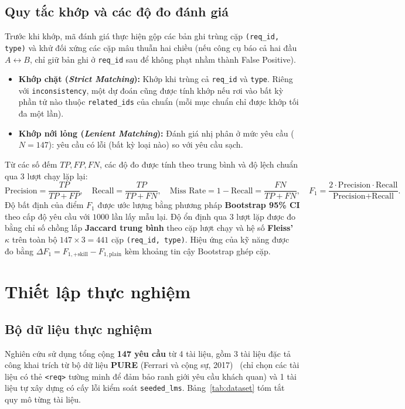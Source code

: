\documentclass[12pt,a4paper]{report}
\begin{document}
\section{Quy tắc khớp và các độ đo đánh giá}
Trước khi khớp, mã đánh giá thực hiện gộp các bản ghi trùng cặp \texttt{(req\_id, type)} và khử đối xứng các cặp mâu thuẫn hai chiều (nếu công cụ báo cả hai đầu $A \leftrightarrow B$, chỉ giữ bản ghi ở \texttt{req\_id} sau để không phạt nhầm thành False Positive).
\begin{itemize}
  \item \textbf{Khớp chặt (\textit{Strict Matching}):} Khớp khi trùng cả \texttt{req\_id} và \texttt{type}. Riêng với \texttt{inconsistency}, một dự đoán cũng được tính khớp nếu rơi vào bất kỳ phần tử nào thuộc \texttt{related\_ids} của chuẩn (mỗi mục chuẩn chỉ được khớp tối đa một lần).
  \item \textbf{Khớp nới lỏng (\textit{Lenient Matching}):} Đánh giá nhị phân ở mức yêu cầu ($N = 147$): yêu cầu có lỗi (bất kỳ loại nào) so với yêu cầu sạch.
\end{itemize}

Từ các số đếm $TP, FP, FN$, các độ đo được tính theo trung bình và độ lệch chuẩn qua 3 lượt chạy lặp lại:
\[
  \text{Precision} = \frac{TP}{TP + FP}, \quad
  \text{Recall} = \frac{TP}{TP + FN}, \quad
  \text{Miss Rate} = 1 - \text{Recall} = \frac{FN}{TP + FN}, \quad
  F_1 = \frac{2 \cdot \text{Precision} \cdot \text{Recall}}{\text{Precision} + \text{Recall}}.
\]
Độ bất định của điểm $F_1$ được ước lượng bằng phương pháp \textbf{Bootstrap 95\% CI} theo cấp độ yêu cầu với $1000$ lần lấy mẫu lại. Độ ổn định qua 3 lượt lặp được đo bằng chỉ số chồng lấp \textbf{Jaccard trung bình} theo cặp lượt chạy và hệ số \textbf{Fleiss' $\kappa$} trên toàn bộ $147 \times 3 = 441$ cặp \texttt{(req\_id, type)}. Hiệu ứng của kỹ năng được đo bằng $\Delta F_1 = F_{1,\text{+skill}} - F_{1,\text{plain}}$ kèm khoảng tin cậy Bootstrap ghép cặp.

\chapter{Thiết lập thực nghiệm}

\section{Bộ dữ liệu thực nghiệm}
Nghiên cứu sử dụng tổng cộng \textbf{147 yêu cầu} từ 4 tài liệu, gồm 3 tài liệu đặc tả công khai trích từ bộ dữ liệu \textbf{PURE} (Ferrari và cộng sự, 2017)~\cite{ferrari2017} (chỉ chọn các tài liệu có thẻ \texttt{<req>} tường minh để đảm bảo ranh giới yêu cầu khách quan) và 1 tài liệu tự xây dựng có cấy lỗi kiểm soát \texttt{seeded\_lms}. Bảng~\ref{tab:dataset} tóm tắt quy mô từng tài liệu.
\end{document}
